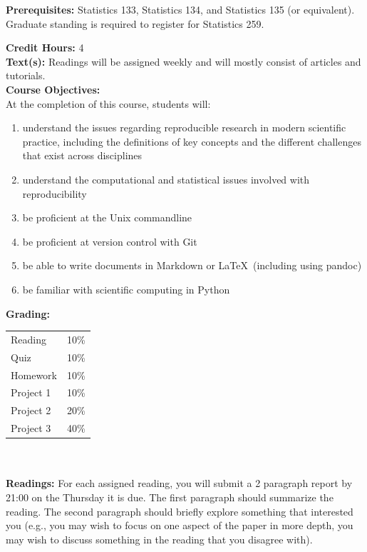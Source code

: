 \documentclass[11pt]{article}
\begin{document}
\textbf {Prerequisites:} Statistics 133, Statistics 134, and Statistics 135
(or equivalent). Graduate standing is required to register for Statistics 259.

\textbf {Credit Hours:} 4 \\

\textbf {\large Text(s):}
Readings will be assigned weekly and will mostly consist of articles and tutorials. \\

\textbf {\large Course Objectives:} \\
At the completion of this course, students will:
\begin{enumerate} \itemsep-0.4em
  \item understand the issues regarding reproducible research in modern scientific practice, including the definitions of key concepts and the different challenges that exist across disciplines
  \item understand the computational and statistical issues involved with
  reproducibility
  \item be proficient at the Unix commandline
  \item be proficient at version control with Git
  \item be able to write documents in Markdown or \LaTeX\ (including using
        pandoc)
  \item be familiar with scientific computing in Python


\end{enumerate}

\textbf {\large Grading:} \\
\hspace*{40mm}
\begin{tabular}{ l l }
Reading  & 10\% \\
Quiz  & 10\% \\
Homework & 10\% \\
Project 1 & 10\% \\
Project 2 & 20\% \\
Project 3 & 40\% \\
\end{tabular} \\\\

\textbf{Readings:} For each assigned reading, you will submit a 2 paragraph
report by 21:00 on the Thursday it is due. The first paragraph should summarize
the reading.  The second paragraph should briefly explore something that
interested you (e.g., you may wish to focus on one aspect of the paper in more
depth, you may wish to discuss something in the reading that you disagree with).\\
\end{document}
